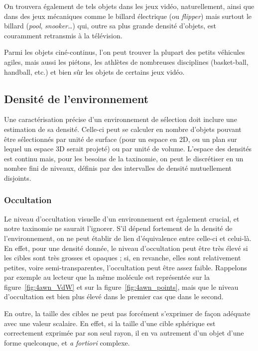 	On trouvera également de tels objets dans les jeux vidéo, naturellement, ainsi que dans des jeux \og mécaniques \fg{}  comme le billard électrique (ou \emph{flipper}) mais surtout le billard (\emph{pool}, \emph{snooker}\ldots{}) qui, outre sa plus grande densité d'objets, est couramment retransmis à la télévision.
	
	Parmi les objets ciné-continus, l'on peut trouver la plupart des petits véhicules agiles, mais aussi les piétons, les athlètes de nombreuses disciplines (basket-ball, handball, etc.) et bien sûr les objets de certains jeux vidéo.


	\FloatBarrier \subsection{Densité de l'environnement}
	Une caractérisation précise d'un environnement de sélection doit inclure une estimation de sa densité. Celle-ci peut se calculer en nombre d'objets pouvant être sélectionnés par unité de surface (pour un espace en 2D, ou un plan sur lequel un espace 3D serait projeté) ou par unité de volume. L'espace des densités est continu mais, pour les besoins de la taxinomie, on peut le discrétiser en un nombre fini de niveaux, définis par des intervalles de densité mutuellement disjoints.
	
	\FloatBarrier \subsubsection{Occultation}
	Le niveau d'occultation visuelle d'un environnement est également crucial, et notre taxinomie ne saurait l'ignorer. S'il dépend fortement de la densité de l'environnement, on ne peut établir de lien d'équivalence entre celle-ci et celui-là. En effet, pour une densité donnée, le niveau d'occultation peut être très élevé si les cibles sont très grosses et opaques ; si, en revanche, elles sont relativement petites, voire semi-transparentes, l'occultation peut être assez faible. Rappelons par exemple au lecteur que la même molécule est représentée sur la figure~\ref{fig:4awn_VdW} et sur la figure~\ref{fig:4awn_points}, mais que le niveau d'occultation est bien plus élevé dans le premier cas que dans le second.
	
	En outre, la \og taille \fg{} des cibles ne peut pas forcément s'exprimer de façon adéquate avec une valeur scalaire. En effet, si la taille d'une cible sphérique est correctement exprimée par son seul rayon, il en va autrement d'un objet d'une forme quelconque, et \emph{a fortiori} complexe.
	
